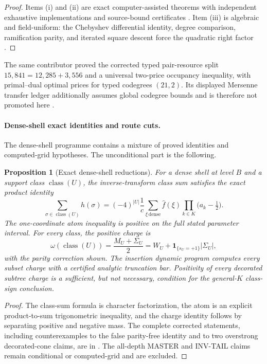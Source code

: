 \documentclass[11pt,a4paper]{amsart}
\numberwithin{equation}{section}
\newtheorem{proposition}[theorem]{Proposition}
\theoremstyle{remark}
\begin{document}
\begin{proof}
Items (i) and (ii) are exact computer-assisted theorems with independent exhaustive implementations and source-bound certificates \cite{ReyD128Inject26,ReyD128Quartic26}.  Item (iii) is algebraic and field-uniform: the Chebyshev differential identity, degree comparison, ramification parity, and iterated square descent force the quadratic right factor \cite{ReyChebDescent26}.
\end{proof}

The same contributor proved the corrected typed pair-resource split $15{,}841=12{,}285+3{,}556$ and a universal two-price occupancy inequality, with primal--dual optimal prices for typed codegrees $(21,2)$.  Its displayed Mersenne transfer ledger additionally assumes global codegree bounds and is therefore not promoted here \cite{ReyPairResource26}.

\paragraph{Dense-shell exact identities and route cuts.}
The dense-shell programme contains a mixture of proved identities and computed-grid hypotheses.  The unconditional part is the following.

\begin{proposition}[Exact dense-shell reductions]\label{prop:dense-shell}
For a dense shell at level $B$ and a support class $\operatorname{class}(U)$, the inverse-transform class sum satisfies the exact product identity
\[
 \sum_{\sigma\in\operatorname{class}(U)}h(\sigma)
 =(-4)^{|U|}\frac1c\sum_{\xi\,\mathrm{dense}}
 \widehat f(\xi)\prod_{k\in K}\bigl(a_k-\tfrac12\bigr).
\]
The one-coordinate atom inequality is positive on the full stated parameter interval.  For every class, the positive charge is
\[
 \omega(\operatorname{class}(U))
 =\frac{M_U+\Sigma_U}{2}
 =W_U+\mathbf 1_{\{s_U=+1\}}|\Sigma_U|,
\]
with the parity correction shown.  The insertion dynamic program computes every subset charge with a certified analytic truncation bar.  Positivity of every decorated subtree charge is a sufficient, but not necessary, condition for the general-$K$ class-sign conclusion.
\end{proposition}

\begin{proof}
The class-sum formula is character factorization, the atom is an explicit product-to-sum trigonometric inequality, and the charge identity follows by separating positive and negative mass.  The complete corrected statements, including counterexamples to the false parity-free identity and to two overstrong decorated-cone claims, are in \cite{DenseShellCharges26}.  The all-depth MASTER and INV-TAIL claims remain conditional or computed-grid and are excluded.
\end{proof}
\end{document}
